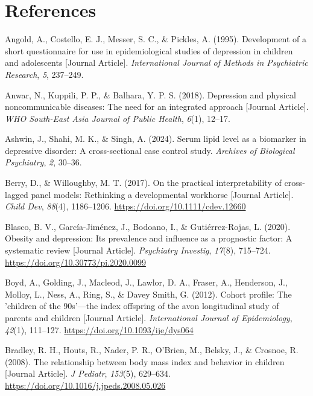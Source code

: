 \documentclass[
  letterpaper,
  DIV=11,
  numbers=noendperiod]{scrreport}
\newlength{\cslhangindent}
\newenvironment{CSLReferences}[2] %
 {\begin{list}{}{%
  \setlength{\itemindent}{0pt}
  \setlength{\leftmargin}{0pt}
  \setlength{\parsep}{0pt}
  \ifodd #1
   \setlength{\leftmargin}{\cslhangindent}
   \setlength{\itemindent}{-1\cslhangindent}
  \fi
  \setlength{\itemsep}{#2\baselineskip}}}
 {\end{list}}
\begin{document}

\section*{References}\label{bibliography--6}

\label{refs--6}
\begin{CSLReferences}{1}{0}
Angold, A., Costello, E. J., Messer, S. C., \& Pickles, A. (1995).
Development of a short questionnaire for use in epidemiological studies
of depression in children and adolescents {[}Journal Article{]}.
\emph{International Journal of Methods in Psychiatric Research},
\emph{5}, 237--249.

Anwar, N., Kuppili, P. P., \& Balhara, Y. P. S. (2018). Depression and
physical noncommunicable diseases: The need for an integrated approach
{[}Journal Article{]}. \emph{WHO South-East Asia Journal of Public
Health}, \emph{6}(1), 12--17.

Ashwin, J., Shahi, M. K., \& Singh, A. (2024). Serum lipid level as a
biomarker in depressive disorder: A cross-sectional case control study.
\emph{Archives of Biological Psychiatry}, \emph{2}, 30--36.

Berry, D., \& Willoughby, M. T. (2017). On the practical
interpretability of cross-lagged panel models: Rethinking a
developmental workhorse {[}Journal Article{]}. \emph{Child Dev},
\emph{88}(4), 1186--1206. \url{https://doi.org/10.1111/cdev.12660}

Blasco, B. V., García-Jiménez, J., Bodoano, I., \& Gutiérrez-Rojas, L.
(2020). Obesity and depression: Its prevalence and influence as a
prognostic factor: A systematic review {[}Journal Article{]}.
\emph{Psychiatry Investig}, \emph{17}(8), 715--724.
\url{https://doi.org/10.30773/pi.2020.0099}

Boyd, A., Golding, J., Macleod, J., Lawlor, D. A., Fraser, A.,
Henderson, J., Molloy, L., Ness, A., Ring, S., \& Davey Smith, G.
(2012). Cohort profile: The 'children of the 90s'---the index offspring
of the avon longitudinal study of parents and children {[}Journal
Article{]}. \emph{International Journal of Epidemiology}, \emph{42}(1),
111--127. \url{https://doi.org/10.1093/ije/dys064}

Bradley, R. H., Houts, R., Nader, P. R., O'Brien, M., Belsky, J., \&
Crosnoe, R. (2008). The relationship between body mass index and
behavior in children {[}Journal Article{]}. \emph{J Pediatr},
\emph{153}(5), 629--634.
\url{https://doi.org/10.1016/j.jpeds.2008.05.026}


\end{CSLReferences}
\end{document}
